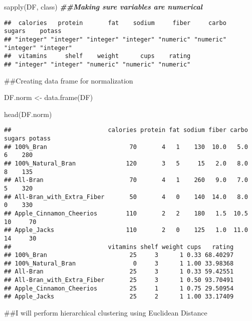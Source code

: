 \documentclass[
]{article}
\newenvironment{Shaded}{\begin{snugshade}}{\end{snugshade}}
\newcommand{\DocumentationTok}[1]{\textcolor[rgb]{0.56,0.35,0.01}{\textbf{\textit{#1}}}}
\newcommand{\FunctionTok}[1]{\textcolor[rgb]{0.00,0.00,0.00}{#1}}
\newcommand{\NormalTok}[1]{#1}
\newcommand{\OtherTok}[1]{\textcolor[rgb]{0.56,0.35,0.01}{#1}}
\begin{document}
\begin{Shaded}
\begin{Highlighting}[]
\FunctionTok{sapply}\NormalTok{(DF, class) }\DocumentationTok{\#\#Making sure variables are numerical}
\end{Highlighting}
\end{Shaded}

\begin{verbatim}
##  calories   protein       fat    sodium     fiber     carbo    sugars    potass 
## "integer" "integer" "integer" "integer" "numeric" "numeric" "integer" "integer" 
##  vitamins     shelf    weight      cups    rating 
## "integer" "integer" "numeric" "numeric" "numeric"
\end{verbatim}

\#\#Creating data frame for normalization

\begin{Shaded}
\begin{Highlighting}[]
\NormalTok{DF.norm }\OtherTok{\textless{}{-}} \FunctionTok{data.frame}\NormalTok{(DF)}

\FunctionTok{head}\NormalTok{(DF.norm)}
\end{Highlighting}
\end{Shaded}

\begin{verbatim}
##                           calories protein fat sodium fiber carbo sugars potass
## 100%_Bran                       70       4   1    130  10.0   5.0      6    280
## 100%_Natural_Bran              120       3   5     15   2.0   8.0      8    135
## All-Bran                        70       4   1    260   9.0   7.0      5    320
## All-Bran_with_Extra_Fiber       50       4   0    140  14.0   8.0      0    330
## Apple_Cinnamon_Cheerios        110       2   2    180   1.5  10.5     10     70
## Apple_Jacks                    110       2   0    125   1.0  11.0     14     30
##                           vitamins shelf weight cups   rating
## 100%_Bran                       25     3      1 0.33 68.40297
## 100%_Natural_Bran                0     3      1 1.00 33.98368
## All-Bran                        25     3      1 0.33 59.42551
## All-Bran_with_Extra_Fiber       25     3      1 0.50 93.70491
## Apple_Cinnamon_Cheerios         25     1      1 0.75 29.50954
## Apple_Jacks                     25     2      1 1.00 33.17409
\end{verbatim}

\#\#I will perform hierarchical clustering using Euclidean Distance
\end{document}
